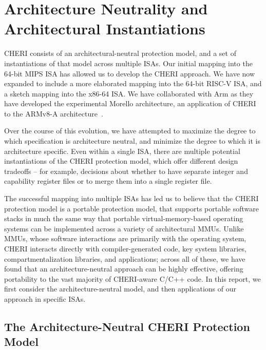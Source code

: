 \section{Architecture Neutrality and Architectural Instantiations}
\label{sec:archneut}

CHERI consists of an architectural-neutral protection model, and a set of
instantiations of that model across multiple ISAs.
Our initial mapping into the 64-bit MIPS ISA has allowed us to develop the
CHERI approach.
We have now expanded to include a more elaborated mapping into
the 64-bit RISC-V ISA, and a sketch mapping into the x86-64 ISA.
We have collaborated with Arm as they have developed the experimental Morello
architecture, an application of CHERI to the ARMv8-A
architecture~\cite{arm-morello}.

Over the course of this evolution, we have attempted to maximize the degree to
which specification is architecture neutral, and minimize the degree to which
it is architecture specific.
Even within a single ISA, there are multiple potential instantiations of the
CHERI protection model, which offer different design tradeoffs -- for example,
decisions about whether to have separate integer and capability register files
or to merge them into a single register file.

The successful mapping into multiple ISAs has led us to believe that the CHERI
protection model is a portable protection model, that supports portable
software stacks in much the same way that portable virtual-memory-based
operating systems can be implemented across a variety of architectural MMUs.
Unlike MMUs, whose software interactions are primarily with the operating
system, CHERI interacts directly with compiler-generated code, key system
libraries, compartmentalization libraries, and applications; across all of
these, we have found that an architecture-neutral approach can be highly
effective, offering portability to the vast majority of CHERI-aware C/C++
code.
In this report, we first consider the architecture-neutral model, and then
applications of our approach in specific ISAs.

\subsection{The Architecture-Neutral CHERI Protection Model}
\label{sec:cheri-protection-model}

